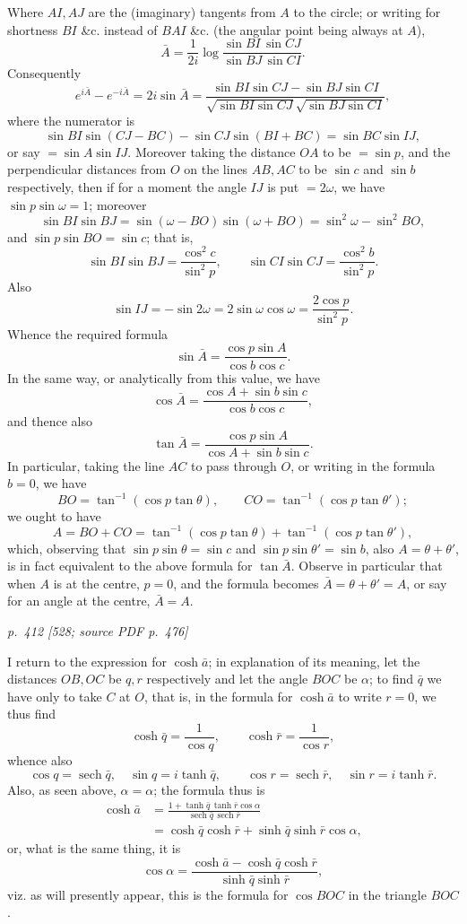 \documentclass[11pt,a4paper]{article}
\newcommand{\pagemarker}[3]{\par\bigskip\noindent\textit{p.~#1 [#2; source PDF p.~#3]}\par\smallskip}
\newcommand{\sech}{\operatorname{sech}}
\begin{document}
Where $AI,AJ$ are the (imaginary) tangents from $A$ to the circle; or writing for
shortness $BI$ \&c. instead of $BAI$ \&c. (the angular point being always at $A$),
\[
\bar A=\frac1{2i}\log\frac{\sin BI\,\sin CJ}{\sin BJ\,\sin CI}.
\]
Consequently
\[
e^{i\bar A}-e^{-i\bar A}
=2i\sin\bar A
=\frac{\sin BI\sin CJ-\sin BJ\sin CI}
{\sqrt{\sin BI\sin CJ}\sqrt{\sin BJ\sin CI}},
\]
where the numerator is
\[
\sin BI\sin(CJ-BC)-\sin CJ\sin(BI+BC)=\sin BC\sin IJ,
\]
or say $=\sin A\sin IJ$. Moreover taking the distance $OA$ to be $=\sin p$, and the
perpendicular distances from $O$ on the lines $AB,AC$ to be $\sin c$ and $\sin b$
respectively, then if for a moment the angle $IJ$ is put $=2\omega$, we have
$\sin p\sin\omega=1$; moreover
\[
\sin BI\sin BJ=\sin(\omega-BO)\sin(\omega+BO)=\sin^2\omega-\sin^2BO,
\]
and $\sin p\sin BO=\sin c$; that is,
\[
\sin BI\sin BJ=\frac{\cos^2c}{\sin^2p},
\qquad
\sin CI\sin CJ=\frac{\cos^2b}{\sin^2p}.
\]
Also
\[
\sin IJ=-\sin2\omega=2\sin\omega\cos\omega
=\frac{2\cos p}{\sin^2p}.
\]
Whence the required formula
\[
\sin\bar A=\frac{\cos p\sin A}{\cos b\cos c}.
\]
In the same way, or analytically from this value, we have
\[
\cos\bar A=\frac{\cos A+\sin b\sin c}{\cos b\cos c},
\]
and thence also
\[
\tan\bar A=\frac{\cos p\sin A}{\cos A+\sin b\sin c}.
\]
In particular, taking the line $AC$ to pass through $O$, or writing in the formula
$b=0$, we have
\[
BO=\tan^{-1}(\cos p\tan\theta),\qquad
CO=\tan^{-1}(\cos p\tan\theta');
\]
we ought to have
\[
A=BO+CO=\tan^{-1}(\cos p\tan\theta)+\tan^{-1}(\cos p\tan\theta'),
\]
which, observing that $\sin p\sin\theta=\sin c$ and $\sin p\sin\theta'=\sin b$, also
$A=\theta+\theta'$, is in fact equivalent to the above formula for $\tan\bar A$.
Observe in particular that when $A$ is at the centre, $p=0$, and the formula becomes
$\bar A=\theta+\theta'=A$, or say for an angle at the centre, $\bar A=A$.

\pagemarker{412}{528}{476}

I return to the expression for $\cosh\bar a$; in explanation of its meaning, let the
distances $OB,OC$ be $q,r$ respectively and let the angle $BOC$ be $\alpha$; to find
$\bar q$ we have only to take $C$ at $O$, that is, in the formula for $\cosh\bar a$ to
write $r=0$, we thus find
\[
\cosh\bar q=\frac1{\cos q},\qquad
\cosh\bar r=\frac1{\cos r},
\]
whence also
\[
\cos q=\sech\bar q,\quad \sin q=i\tanh\bar q,\qquad
\cos r=\sech\bar r,\quad \sin r=i\tanh\bar r.
\]
Also, as seen above, $\alpha=\alpha$; the formula thus is
\[
\begin{aligned}
\cosh\bar a
&=\frac{1+\tanh\bar q\,\tanh\bar r\cos\alpha}
{\sech\bar q\,\sech\bar r}\\
&=\cosh\bar q\cosh\bar r+\sinh\bar q\sinh\bar r\cos\alpha,
\end{aligned}
\]
or, what is the same thing, it is
\[
\cos\alpha=\frac{\cosh\bar a-\cosh\bar q\cosh\bar r}
{\sinh\bar q\sinh\bar r},
\]
viz. as will presently appear, this is the formula for $\cos BOC$ in the triangle
$BOC$.
\end{document}

